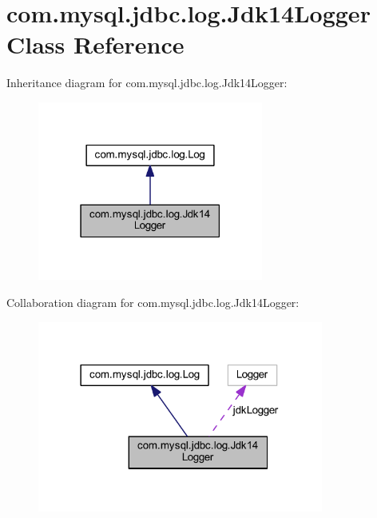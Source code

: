 \hypertarget{classcom_1_1mysql_1_1jdbc_1_1log_1_1_jdk14_logger}{}\section{com.\+mysql.\+jdbc.\+log.\+Jdk14\+Logger Class Reference}
\label{classcom_1_1mysql_1_1jdbc_1_1log_1_1_jdk14_logger}


Inheritance diagram for com.\+mysql.\+jdbc.\+log.\+Jdk14\+Logger\+:
\nopagebreak
\begin{figure}[H]
\begin{center}
\leavevmode
\includegraphics[width=210pt]{classcom_1_1mysql_1_1jdbc_1_1log_1_1_jdk14_logger__inherit__graph}
\end{center}
\end{figure}


Collaboration diagram for com.\+mysql.\+jdbc.\+log.\+Jdk14\+Logger\+:
\nopagebreak
\begin{figure}[H]
\begin{center}
\leavevmode
\includegraphics[width=266pt]{classcom_1_1mysql_1_1jdbc_1_1log_1_1_jdk14_logger__coll__graph}
\end{center}
\end{figure}

